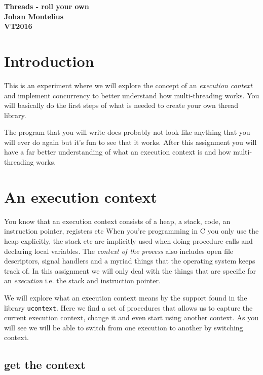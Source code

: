 \documentclass[a4paper,11pt]{article}
\begin{document}
\begin{center} \vspace{20pt} \textbf{\large Threads - roll your own}\\
\vspace{10pt} \textbf{Johan Montelius}\\ \vspace{10pt} \textbf{VT2016}
\end{center}


\section{Introduction}

This is an experiment where we will explore the concept of an {\em
  execution context} and implement concurrency to better understand
how multi-threading works. You will basically do the first steps of
what is needed to create your own thread library. 

The program that you will write does probably not look like anything
that you will ever do again but it's fun to see that it works. After
this assignment you will have a far better understanding of what an
execution context is and how multi-threading works.


\section{An execution context}

You know that an execution context consists of a heap, a stack, code,
an instruction pointer, registers etc When you're programming in C you
only use the heap explicitly, the stack etc are implicitly used when
doing procedure calls and declaring local variables. The {\em context
  of the process} also includes open file descriptors, signal handlers
and a myriad things that the operating system keeps track of. In this
assignment we will only deal with the things that are specific for an
{\em execution} i.e. the stack and instruction pointer.


We will explore what an execution context means by the support found
in the library {\tt ucontext}. Here we find a set of procedures that
allows us to capture the current execution context, change it and even
start using another context. As you will see we will be able to switch
from one execution to another by switching context. 

\subsection{get the context}
\end{document}
